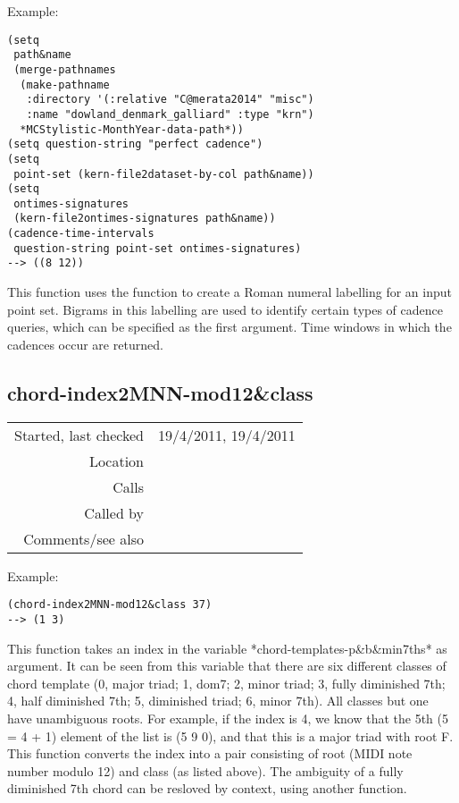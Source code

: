 \vspace{0.5cm}
\noindent Example:
\begin{verbatim}
(setq
 path&name
 (merge-pathnames
  (make-pathname
   :directory '(:relative "C@merata2014" "misc")
   :name "dowland_denmark_galliard" :type "krn")
  *MCStylistic-MonthYear-data-path*))
(setq question-string "perfect cadence")
(setq
 point-set (kern-file2dataset-by-col path&name))
(setq
 ontimes-signatures
 (kern-file2ontimes-signatures path&name))
(cadence-time-intervals
 question-string point-set ontimes-signatures)
--> ((8 12))
\end{verbatim}

\noindent This function uses the function
 to create a Roman
numeral labelling for an input point set. Bigrams in
this labelling are used to identify certain types of
cadence queries, which can be specified as the first
argument. Time windows in which the cadences occur
are returned.


\subsection*{chord-index2MNN-mod12\&class}\label{fun:chord-index2MNN-mod12nclass}

\vspace{0.3cm}
\begin{tabular}{r|p{8cm}}
Started, last checked & 19/4/2011, 19/4/2011 \\
Location & \nameref{sec:chord-labelling} \\
Calls & \\
Called by & \nameref{fun:labelled-listed-segments2datapoints} \\
Comments/see also &
\end{tabular}

\vspace{0.5cm}
\noindent Example:
\begin{verbatim}
(chord-index2MNN-mod12&class 37)
--> (1 3)
\end{verbatim}

\noindent This function takes an index in the variable
*chord-templates-p\&b\&min7ths* as argument. It can be
seen from this variable that there are six different
classes of chord template (0, major triad; 1, dom7;
2, minor triad; 3, fully diminished 7th; 4, half
diminished 7th; 5, diminished triad; 6, minor 7th).
All classes but one have unambiguous roots. For
example, if the index is 4, we know that the 5th (5 =
4 + 1) element of the list is (5 9 0), and that this
is a major triad with root F. This function converts
the index into a pair consisting of root (MIDI note
number modulo 12) and class (as listed above). The
ambiguity of a fully diminished 7th chord can be
resloved by context, using another function.


